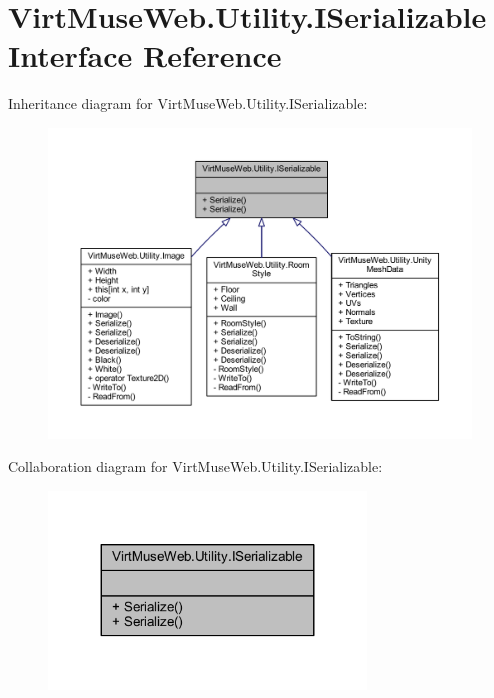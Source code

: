 \hypertarget{interface_virt_muse_web_1_1_utility_1_1_i_serializable}{}\section{Virt\+Muse\+Web.\+Utility.\+I\+Serializable Interface Reference}
\label{interface_virt_muse_web_1_1_utility_1_1_i_serializable}


Inheritance diagram for Virt\+Muse\+Web.\+Utility.\+I\+Serializable\+:
\nopagebreak
\begin{figure}[H]
\begin{center}
\leavevmode
\includegraphics[width=350pt]{interface_virt_muse_web_1_1_utility_1_1_i_serializable__inherit__graph}
\end{center}
\end{figure}


Collaboration diagram for Virt\+Muse\+Web.\+Utility.\+I\+Serializable\+:
\nopagebreak
\begin{figure}[H]
\begin{center}
\leavevmode
\includegraphics[width=239pt]{interface_virt_muse_web_1_1_utility_1_1_i_serializable__coll__graph}
\end{center}
\end{figure}
